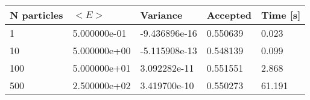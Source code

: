 \begin{table}[h!]
\centering 
\begin{tabular}{|l|l|l|l|l|}
\hline 
N particles & $<E>$ & Variance & Accepted & Time [s]\\ 
 \hline 
1 & 5.000000e-01 & -9.436896e-16 & 0.550639 & 0.023 \\ \hline 
10 & 5.000000e+00 & -5.115908e-13 & 0.548139 & 0.099 \\ \hline 
100 & 5.000000e+01 & 3.092282e-11 & 0.551551 & 2.868 \\ \hline 
500 & 2.500000e+02 & 3.419700e-10 & 0.550273 & 61.191 \\ \hline 
\end{tabular}
\label{tab:hn1} 
\end{table} 
